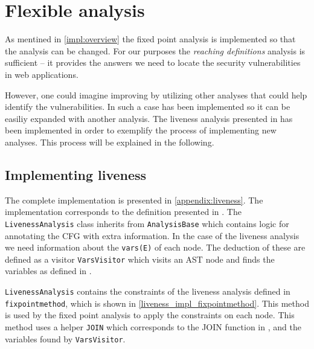 \section{Flexible analysis}\label{impl:flexible}
As mentined in \cref{impl:overview} the fixed point analysis is implemented so that the analysis can be changed.
For our purposes the \emph{reaching definitions} analysis is sufficient -- it provides the answers we need to locate the security vulnerabilities in web applications.

However, one could imagine improving \pyt{} by utilizing other analyses that could help identify the vulnerabilities.
In such a case \pyt{} has been implemented so it can be easiliy expanded with another analysis.
The liveness analysis presented in \citet[p.~19]{schwartzbach} has been implemented in order to exemplify the process of implementing new analyses.
This process will be explained in the following.

\subsection{Implementing liveness}
The complete implementation is presented in \cref{appendix:liveness}.
The implementation corresponds to the definition presented in \citet[p.~20]{schwartzbach}.
The \texttt{LivenessAnalysis} class inherits from \texttt{AnalysisBase} which contains logic for annotating the CFG with extra information.
In the case of the liveness analysis we need information about the \texttt{vars(E)} of each node.
The deduction of these are defined as a visitor \texttt{VarsVisitor}  which visits an AST node and finds the variables as defined in \citet{schwartzbach}.

\texttt{LivenessAnalysis} contains the constraints of the liveness analysis defined in \texttt{fixpointmethod}, which is shown in \cref{liveness_impl_fixpointmethod}.
This method is used by the fixed point analysis to apply the constraints on each node.
This method uses a helper \texttt{JOIN} which corresponds to the JOIN function in \citet{schwartzbach}, and the variables found by \texttt{VarsVisitor}.

